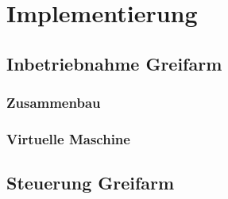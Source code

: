 \section {Implementierung}

\subsection {Inbetriebnahme Greifarm}
\subsubsection{Zusammenbau}
\subsubsection{Virtuelle Maschine}

\subsection{Steuerung Greifarm}

\newpage